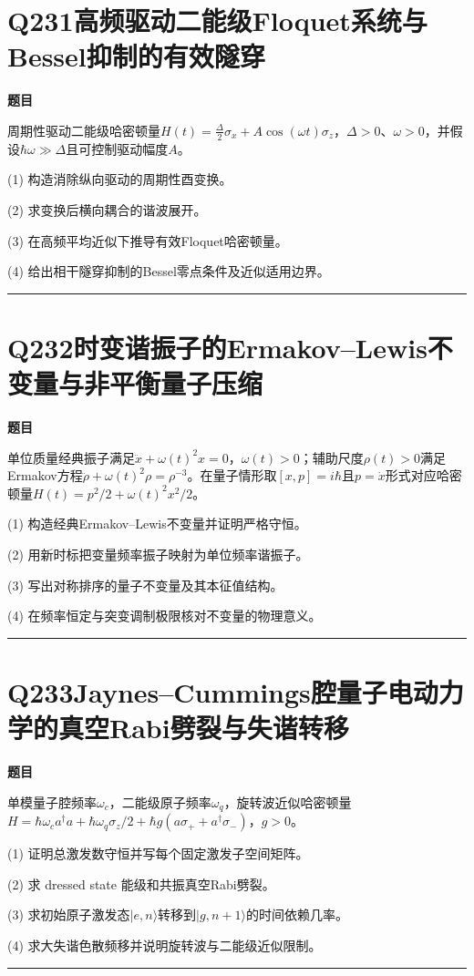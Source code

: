 \documentclass[UTF8,a4paper,11pt,oneside,openany]{ctexbook}
\begin{document}
\section*{Q231\quad 高频驱动二能级Floquet系统与Bessel抑制的有效隧穿}
\textbf{题目}\par
周期性驱动二能级哈密顿量$H(t)=\frac\Delta2\sigma_x+A\cos(\omega t)\sigma_z$，$\Delta>0$、$\omega>0$，并假设$\hbar\omega\gg\Delta$且可控制驱动幅度$A$。
\par\smallskip\noindent (1) 构造消除纵向驱动的周期性酉变换。
\par\smallskip\noindent (2) 求变换后横向耦合的谐波展开。
\par\smallskip\noindent (3) 在高频平均近似下推导有效Floquet哈密顿量。
\par\smallskip\noindent (4) 给出相干隧穿抑制的Bessel零点条件及近似适用边界。
\par\medskip\hrule\medskip
\section*{Q232\quad 时变谐振子的Ermakov–Lewis不变量与非平衡量子压缩}
\textbf{题目}\par
单位质量经典振子满足$\ddot x+\omega(t)^2x=0$，$\omega(t)>0$；辅助尺度$\rho(t)>0$满足Ermakov方程$\ddot\rho+\omega(t)^2\rho=\rho^{-3}$。在量子情形取$[x,p]=i\hbar$且$p=\dot x$形式对应哈密顿量$H(t)=p^2/2+\omega(t)^2x^2/2$。
\par\smallskip\noindent (1) 构造经典Ermakov–Lewis不变量并证明严格守恒。
\par\smallskip\noindent (2) 用新时标把变量频率振子映射为单位频率谐振子。
\par\smallskip\noindent (3) 写出对称排序的量子不变量及其本征值结构。
\par\smallskip\noindent (4) 在频率恒定与突变调制极限核对不变量的物理意义。
\par\medskip\hrule\medskip
\section*{Q233\quad Jaynes–Cummings腔量子电动力学的真空Rabi劈裂与失谐转移}
\textbf{题目}\par
单模量子腔频率$\omega_c$，二能级原子频率$\omega_q$，旋转波近似哈密顿量$H=\hbar\omega_ca^\dagger a+\hbar\omega_q\sigma_z/2+\hbar g(a\sigma_++a^\dagger\sigma_-)$，$g>0$。
\par\smallskip\noindent (1) 证明总激发数守恒并写每个固定激发子空间矩阵。
\par\smallskip\noindent (2) 求 dressed state 能级和共振真空Rabi劈裂。
\par\smallskip\noindent (3) 求初始原子激发态$|e,n\rangle$转移到$|g,n+1\rangle$的时间依赖几率。
\par\smallskip\noindent (4) 求大失谐色散频移并说明旋转波与二能级近似限制。
\par\medskip\hrule\medskip
\end{document}
